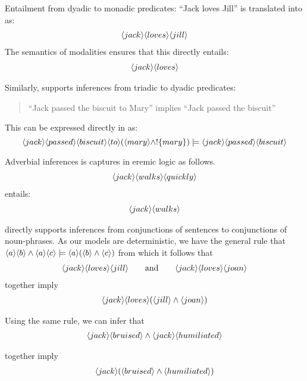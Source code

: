 \NI Entailment from dyadic to monadic predicates:
``Jack loves Jill'' is translated into \ELABR{} as:
\begin{eqnarray*}
   \langle jack \rangle \langle loves \rangle \langle jill \rangle \end{eqnarray*}
The semantics of modalities ensures that this directly entails:
\begin{eqnarray*}
   \langle jack \rangle \langle loves \rangle \end{eqnarray*}

\NI Similarly, \ELABR{} supports inferences from triadic to dyadic
predicates:
\begin{quote}
  ``Jack passed the biscuit to Mary'' implies ``Jack passed the biscuit''
\end{quote}

\NI This can be expressed directly in \ELABR{} as:
\[
   \langle jack \rangle \langle passed \rangle \langle biscuit \rangle \langle to \rangle (\langle mary \rangle \land !\{mary\}) \models \langle jack \rangle \langle passed \rangle \langle biscuit \rangle \]

\NI Adverbial inferences is captures in eremic logic as follows.
\begin{eqnarray*}
\langle jack \rangle \langle walks \rangle \langle quickly \rangle \end{eqnarray*}
entails:
\begin{eqnarray*}
\langle jack \rangle \langle walks \rangle \end{eqnarray*}

\NI \ELABR{} directly supports inferences from conjunctions of
sentences to conjunctions of noun-phrases.  As our models are
deterministic, we have the general rule that $ \langle a \rangle \langle b \rangle \land
\langle a \rangle \langle c \rangle \models \langle a \rangle (\langle b \rangle \land \langle c \rangle )$ from which
it follows that
\begin{eqnarray*}
   \langle jack \rangle \langle loves \rangle \langle jill \rangle \qquad\text{and}\qquad
   \langle jack \rangle \langle loves \rangle \langle joan \rangle \end{eqnarray*}
together imply
\begin{eqnarray*}
\langle jack \rangle \langle loves \rangle (\langle jill \rangle \land \langle joan \rangle )
\end{eqnarray*}

\NI Using the same rule, we can infer that
\begin{eqnarray*}
   \langle jack \rangle \langle bruised \rangle \land \langle jack \rangle \langle humiliated \rangle \end{eqnarray*}

\NI together imply
\begin{eqnarray*}
\langle jack \rangle (\langle bruised \rangle \land \langle humiliated \rangle )
\end{eqnarray*}
 

